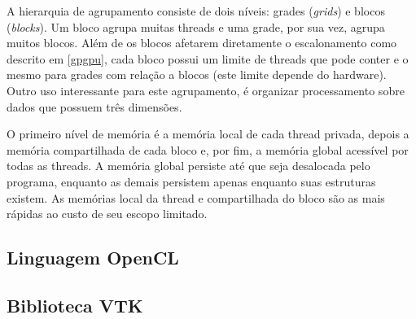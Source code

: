   A hierarquia de agrupamento consiste de dois níveis: grades (\textit{grids}) e blocos (\textit{blocks}). Um bloco agrupa muitas threads e uma grade, por sua vez, agrupa muitos blocos. Além de os blocos afetarem diretamente o escalonamento como descrito em \ref{gpgpu}, cada bloco possui um limite de threads que pode conter e o mesmo para grades com relação a blocos (este limite depende do hardware). Outro uso interessante para este agrupamento, é organizar processamento sobre dados que possuem três dimensões.
  
  O primeiro nível de memória é a memória local de cada thread privada, depois a memória compartilhada de cada bloco e, por fim, a memória global acessível por todas as threads. A memória global persiste até que seja desalocada pelo programa, enquanto as demais persistem apenas enquanto suas estruturas existem. As memórias local da thread e compartilhada do bloco são as mais rápidas ao custo de seu escopo limitado.
    
  \subsection{Linguagem OpenCL}
  
  \subsection{Biblioteca VTK}
